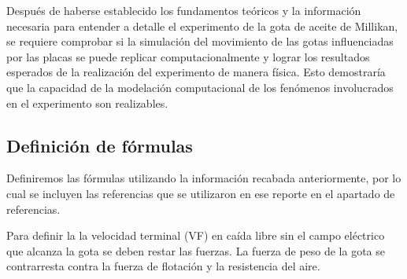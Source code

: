 \documentclass[
 reprint,
 amsmath,amssymb,
 aps,
]{revtex4-2}
\begin{document}
Despu\'es de haberse establecido los fundamentos te\'oricos y la informaci\'on necesaria para entender a detalle el experimento de la gota de aceite de Millikan, se requiere comprobar si la simulaci\'on del movimiento de las gotas influenciadas por las placas se puede replicar computacionalmente y lograr los resultados esperados de la realizaci\'on del experimento de manera f\'isica. Esto demostrar\'ia que la capacidad de la modelaci\'on computacional de los fen\'omenos involucrados en el experimento son realizables.

\subsection{Definici\'on de f\'ormulas}

Definiremos las fórmulas utilizando la información recabada anteriormente, por lo cual se incluyen las referencias que se utilizaron en ese reporte en el apartado de referencias.

Para definir la la velocidad terminal (VF)  en caída libre sin el campo eléctrico que alcanza la gota se deben restar las fuerzas. La fuerza de peso de la gota se contrarresta contra la fuerza de flotación y la resistencia del aire. 
\end{document}
